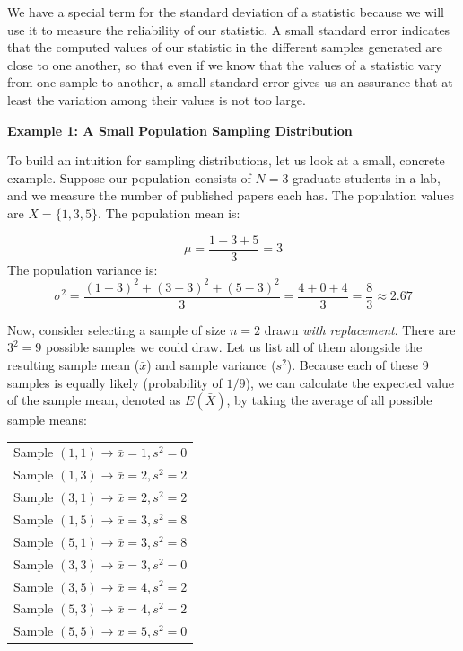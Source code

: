 \documentclass{article}
\begin{document}
We have a special term for the standard deviation of a statistic because we will use it to measure the reliability of our statistic. A small standard error indicates that the computed values of our statistic in the different samples generated are close to one another, so that even if we know that the values of a statistic vary from one sample to another, a small standard error gives us an assurance that at least the variation among their values is not too large.

\textbf{Example 1: A Small Population Sampling Distribution}

To build an intuition for sampling distributions, let us look at a small, concrete example. Suppose our population consists of $N=3$ graduate students in a lab, and we measure the number of published papers each has. The population values are $X=\{1,3,5\}$. The population mean is:

$$\mu=\frac{1+3+5}{3}=3$$
The population variance is:
$$\sigma^2=\frac{(1-3)^2+(3-3)^2+(5-3)^2}{3}=\frac{4+0+4}{3}=\frac{8}{3}\approx2.67$$

Now, consider selecting a sample of size $n=2$ drawn \emph{with replacement}. There are $3^2=9$ possible samples we could draw. Let us list all of them alongside the resulting sample mean ($\bar{x}$) and sample variance ($s^2$). Because each of these 9 samples is equally likely (probability of $1/9$), we can calculate the expected value of the sample mean, denoted as $E(\bar{X})$, by taking the average of all possible sample means:

\begin{margintable}
\begin{tabular}{l} 
Sample $(1,1) \rightarrow \bar{x}=1, s^2=0$ \\
Sample $(1,3) \rightarrow \bar{x}=2, s^2=2$ \\
Sample $(3,1) \rightarrow \bar{x}=2, s^2=2$ \\ 
Sample $(1,5) \rightarrow \bar{x}=3, s^2=8$ \\
Sample $(5,1) \rightarrow \bar{x}=3, s^2=8$ \\
Sample $(3,3) \rightarrow \bar{x}=3, s^2=0$ \\
Sample $(3,5) \rightarrow \bar{x}=4, s^2=2$ \\
Sample $(5,3) \rightarrow \bar{x}=4, s^2=2$ \\
Sample $(5,5) \rightarrow \bar{x}=5, s^2=0$
\end{tabular}
\end{margintable}
\end{document}
